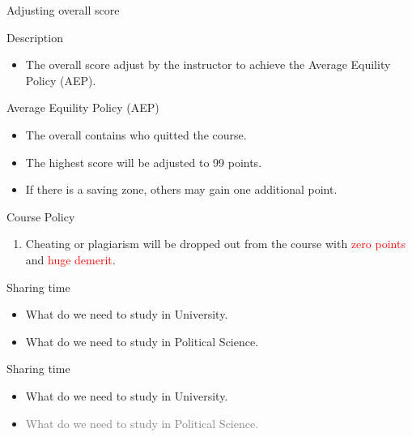 \documentclass{beamer}
\begin{document}
\begin{frame}{Adjusting overall score}
\begin{block}{Description}
\begin{itemize}
\item The overall score adjust by the instructor to achieve the Average Equility Policy (AEP).
\end{itemize}
\end{block}
\begin{block}{Average Equility Policy (AEP)}
\begin{itemize}
\item The overall contains who quitted the course.
\item The highest score will be adjusted to 99 points.
\item If there is a saving zone, others may gain one additional point.
\end{itemize}
\end{block}
\end{frame}
\begin{frame}{Course Policy}
\begin{enumerate}
\item Cheating or plagiarism will be dropped out from the course with \textcolor{red}{zero points} and \textcolor{red}{huge demerit}. \\
\end{enumerate}
\end{frame}
\begin{frame}{Sharing time}
\begin{itemize}
\item What do we need to study in University.
\item What do we need to study in Political Science.
\end{itemize}
\end{frame}
\begin{frame}{Sharing time}
\begin{itemize}
\item What do we need to study in University.
\item \textcolor{gray}{What do we need to study in Political Science.}
\end{itemize}
\end{frame}
\end{document}
